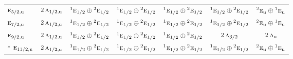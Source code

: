 \documentclass[10pt,a4paper]{article}
\numberwithin{equation}{section}
\newcommand{\irr}[1]{\text{\normalfont\scshape #1}}
\newcommand{\conjpair}[1]{{}^{#1}}
\newcommand{\ptag}[1]{\mathrm{#1}}
\begin{document}
{\begin{longtable}{@{}lcccccc@{}}
$\irr{e}_{5/2,\ptag{u}}$ & $2\,\irr{a}_{1/2,\ptag{u}}$ & $\conjpair{1}\irr{e}_{1/2}\oplus \conjpair{2}\irr{e}_{1/2}$ & $\conjpair{1}\irr{e}_{1/2}\oplus \conjpair{2}\irr{e}_{1/2}$ & $\conjpair{1}\irr{e}_{1/2}\oplus \conjpair{2}\irr{e}_{1/2}$ & $\conjpair{1}\irr{e}_{1/2}\oplus \conjpair{2}\irr{e}_{1/2}$ & $\conjpair{2}\irr{e}_{\ptag{u}}\oplus \conjpair{1}\irr{e}_{\ptag{u}}$\\
$\irr{e}_{7/2,\ptag{u}}$ & $2\,\irr{a}_{1/2,\ptag{u}}$ & $\conjpair{1}\irr{e}_{1/2}\oplus \conjpair{2}\irr{e}_{1/2}$ & $\conjpair{1}\irr{e}_{1/2}\oplus \conjpair{2}\irr{e}_{1/2}$ & $\conjpair{1}\irr{e}_{1/2}\oplus \conjpair{2}\irr{e}_{1/2}$ & $\conjpair{1}\irr{e}_{1/2}\oplus \conjpair{2}\irr{e}_{1/2}$ & $\conjpair{2}\irr{e}_{\ptag{u}}\oplus \conjpair{1}\irr{e}_{\ptag{u}}$\\
$\irr{e}_{9/2,\ptag{u}}$ & $2\,\irr{a}_{1/2,\ptag{u}}$ & $\conjpair{1}\irr{e}_{1/2}\oplus \conjpair{2}\irr{e}_{1/2}$ & $\conjpair{1}\irr{e}_{1/2}\oplus \conjpair{2}\irr{e}_{1/2}$ & $\conjpair{1}\irr{e}_{1/2}\oplus \conjpair{2}\irr{e}_{1/2}$ & $2\,\irr{a}_{3/2}$ & $2\,\irr{a}_{\ptag{u}}$\\*
$\irr{e}_{11/2,\ptag{u}}$ & $2\,\irr{a}_{1/2,\ptag{u}}$ & $\conjpair{1}\irr{e}_{1/2}\oplus \conjpair{2}\irr{e}_{1/2}$ & $\conjpair{1}\irr{e}_{1/2}\oplus \conjpair{2}\irr{e}_{1/2}$ & $\conjpair{1}\irr{e}_{1/2}\oplus \conjpair{2}\irr{e}_{1/2}$ & $\conjpair{1}\irr{e}_{1/2}\oplus \conjpair{2}\irr{e}_{1/2}$ & $\conjpair{2}\irr{e}_{\ptag{u}}\oplus \conjpair{1}\irr{e}_{\ptag{u}}$\\
\bottomrule\end{longtable}}
\end{document}
